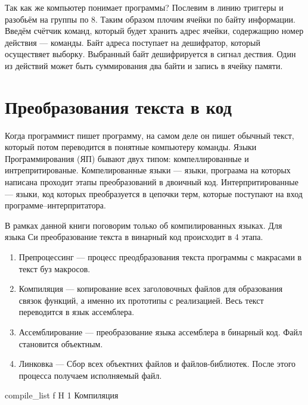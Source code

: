 \documentclass{bmstu}
\begin{document}
Так как же компьютер понимает программы?
Послевим в линию триггеры и разобьём на группы по 8.
Таким образом плочим ячейки по байту информации.
Введём счётчик команд, который будет хранить адрес ячейки, содержащию номер действия --- команды.
Байт адреса поступает на дешифратор, который осуществяет выборку.
Выбранный байт дешифрируется в сигнал дествия.
Один из действий может быть суммирования два байти и запись в ячейку памяти.


\section{Преобразования текста в код}

Когда программист пишет программу, на самом деле он пишет обычный текст, который потом переводится в понятные компьютеру команды.
Языки Программирования (ЯП) бывают двух типом: компеллированные и интрепритированые.
Компелированные языки --- языки, програама на которых написана проходит этапы преобразований в двоичный код.
Интерпритированные --- языки, код которых преобразуется в цепочки терм, которые поступают на вход программе--интерпритатора.

В рамках данной книги поговорим только об компилированных языках.
Для языка Си преобразование текста в винарный код происходит в 4 этапа.


\begin{enumerate}
\item Препроцессинг --- процесс преодбразования текста программы с макрасами в текст буз макросов.
\item Компиляция --- копирование всех заголовочных файлов для образования связок функций, а именно их прототипы с реализацией. Весь текст переводится в язык ассемблера.
\item Ассемблирование --- преобразование языка ассемблера в бинарный код. Файл становится объектным.
\item Линковка --- Сбор всех объектних файлов и файлов-библиотек. После этого процесса получаем исполняемый файл.
\end{enumerate}

    {compile_list}
    {f}
    {H}
    {1\textwidth}
    {Компиляция}


\begin{comment}

\begin{lstlisting}
for (int i = 0; i < iterations; i++)
{
	do something
}
\end{lstlisting}

\end{comment}
\end{document}
